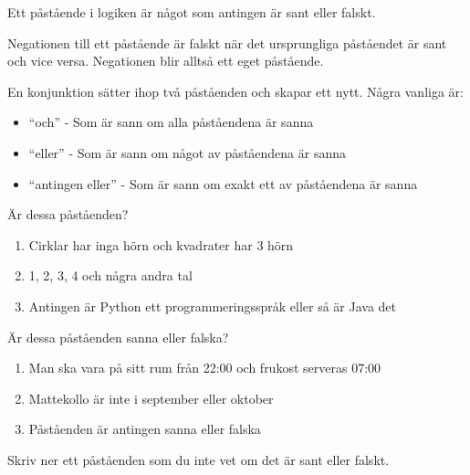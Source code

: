 
\begin{definition}[Påstående]
	Ett påstående i logiken är något som antingen är sant eller falskt.
\end{definition}


\begin{definition}[Negation]
	Negationen till ett påstående är falskt när det ursprungliga påståendet är sant och vice versa. Negationen blir alltså ett eget påstående.
\end{definition}

\begin{definition}[Konjunktion]
	En konjunktion sätter ihop två påståenden och skapar ett nytt. Några vanliga är:
	\begin{itemize}
		\item ``och'' - Som är sann om alla påståendena är sanna
		\item ``eller'' - Som är sann om något av påståendena är sanna
		\item ``antingen eller'' - Som är sann om exakt ett av påståendena är sanna
	\end{itemize}
\end{definition}

\begin{problem}
	Är dessa påståenden?
	\begin{enumerate}[label=\alph*)]
		\item Cirklar har inga hörn och kvadrater har 3 hörn
		\item 1, 2, 3, 4 och några andra tal
		\item Antingen är Python ett programmeringsspråk eller så är Java det
	\end{enumerate}
\end{problem}


\begin{problem}
	Är dessa påståenden sanna eller falska?
	\begin{enumerate}[label=\alph*)]
		\item Man ska vara på sitt rum från 22:00 och frukost serveras 07:00
		\item Mattekollo är inte i september eller oktober
		\item Påståenden är antingen sanna eller falska
	\end{enumerate}
\end{problem} 


\begin{problem}
	Skriv ner ett påståenden som du inte vet om det är sant eller falskt.
\end{problem}

